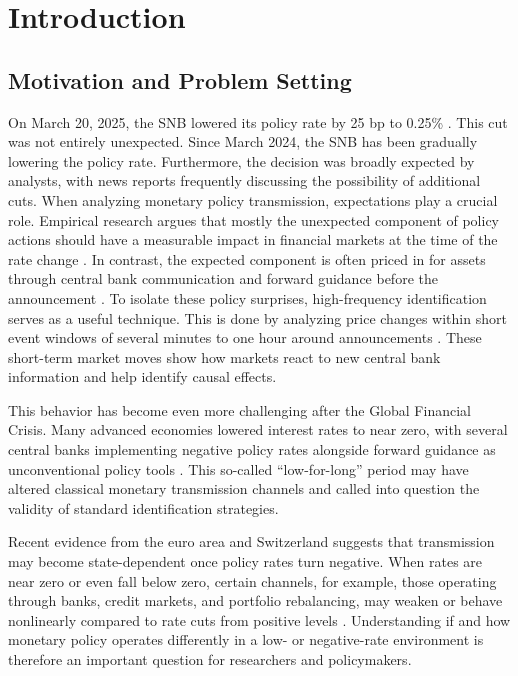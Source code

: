 \documentclass[12pt,a4paper]{article}
\begin{document}
\vspace*{\fill}

\newpage
{}
\newpage

\section{Introduction}
\label{sec:intro}
\subsection{Motivation and Problem Setting}
\label{subsec:motivation}
On March 20, 2025, the SNB lowered its policy rate by 25 bp to 0.25\% \citep{snb2025}. This cut was not entirely unexpected. Since March 2024, the SNB has been gradually lowering the policy rate. Furthermore, the decision was broadly expected by analysts, with news reports frequently discussing the possibility of additional cuts. When analyzing monetary policy transmission, expectations play a crucial role. Empirical research argues that mostly the unexpected component of policy actions should have a measurable impact in financial markets at the time of the rate change \citep{kuttner2001, gurkaynak2005}. In contrast, the expected component is often priced in for assets through central bank communication and forward guidance before the announcement \citep{campbell2012}. To isolate these policy surprises, high-frequency identification serves as a useful technique. This is done by analyzing price changes within short event windows of several minutes to one hour around announcements \citep{jarocinski2020, gurkaynak2005}. These short-term market moves show how markets react to new central bank information and help identify causal effects. 


This behavior has become even more challenging after the Global Financial Crisis. Many advanced economies lowered interest rates to near zero, with several central banks implementing negative policy rates alongside forward guidance as unconventional policy tools \citep{rogoff2017, campbell2012}. This so-called “low-for-long” period \citep{inhoffen2021} may have altered classical monetary transmission channels and called into question the validity of standard identification strategies.


Recent evidence from the euro area and Switzerland suggests that transmission may become state-dependent once policy rates turn negative. When rates are near zero or even fall below zero, certain channels, for example, those operating through banks, credit markets, and portfolio rebalancing, may weaken or behave nonlinearly compared to rate cuts from positive levels \citep{ecb2021, borio2017, baumann2025}. Understanding if and how monetary policy operates differently in a low- or negative-rate environment is therefore an important question for researchers and policymakers.
\end{document}
